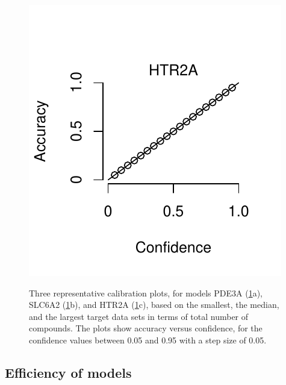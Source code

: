 \documentclass[utf8]{frontiersSCNS} %
\begin{document}
\begin{figure}[h!]
\begin{minipage}[c]{0.3\textwidth}
        \label{fig:calplots:b}
        \subcaption{}
    \end{minipage}
    \begin{minipage}[c]{0.3\textwidth}
        \includegraphics[width=\textwidth]{figures/fig2c_htr2a_calib.pdf}
        \label{fig:calplots:c}
        \subcaption{}
    \end{minipage}
    \caption{Three representative calibration plots, for models PDE3A
    (\ref{fig:calplots}a), SLC6A2  (\ref{fig:calplots}b), and HTR2A
    (\ref{fig:calplots}c), based on the smallest, the median, and the largest
    target data sets in terms of total number of compounds. The plots show
    accuracy versus confidence, for the confidence values between 0.05 and 0.95 with a step
    size of 0.05.}
    \label{fig:calplots}
\end{figure}

\subsection{Efficiency of models}
\end{document}
